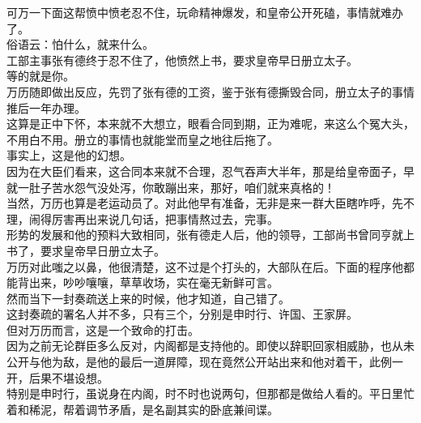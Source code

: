 \begin{multicols}{\theparacolNo}
可万一下面这帮愤中愤老忍不住，玩命精神爆发，和皇帝公开死磕，事情就难办了。\\

俗语云：怕什么，就来什么。\\

工部主事张有德终于忍不住了，他愤然上书，要求皇帝早日册立太子。\\

等的就是你。\\

万历随即做出反应，先罚了张有德的工资，鉴于张有德撕毁合同，册立太子的事情推后一年办理。\\

这算是正中下怀，本来就不大想立，眼看合同到期，正为难呢，来这么个冤大头，不用白不用。册立的事情也就能堂而皇之地往后拖了。\\

事实上，这是他的幻想。\\

因为在大臣们看来，这合同本来就不合理，忍气吞声大半年，那是给皇帝面子，早就一肚子苦水怨气没处泻，你敢蹦出来，那好，咱们就来真格的！\\

当然，万历也算是老运动员了。对此他早有准备，无非是来一群大臣瞎咋呼，先不理，闹得厉害再出来说几句话，把事情熬过去，完事。\\

形势的发展和他的预料大致相同，张有德走人后，他的领导，工部尚书曾同亨就上书了，要求皇帝早日册立太子。\\

万历对此嗤之以鼻，他很清楚，这不过是个打头的，大部队在后。下面的程序他都能背出来，吵吵嚷嚷，草草收场，实在毫无新鲜可言。\\

然而当下一封奏疏送上来的时候，他才知道，自己错了。\\

这封奏疏的署名人并不多，只有三个，分别是申时行、许国、王家屏。\\

但对万历而言，这是一个致命的打击。\\

因为之前无论群臣多么反对，内阁都是支持他的。即使以辞职回家相威胁，也从未公开与他为敌，是他的最后一道屏障，现在竟然公开站出来和他对着干，此例一开，后果不堪设想。\\

特别是申时行，虽说身在内阁，时不时也说两句，但那都是做给人看的。平日里忙着和稀泥，帮着调节矛盾，是名副其实的卧底兼间谍。\\


\end{multicols}
